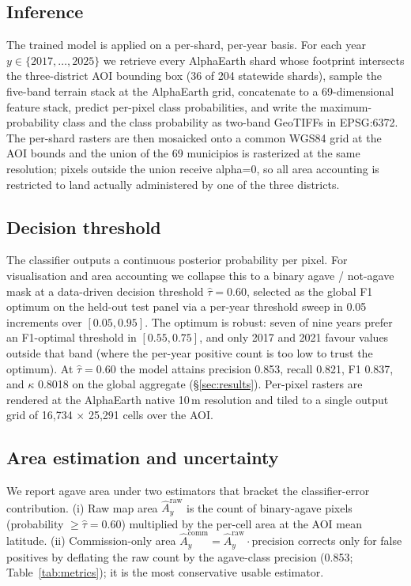 \documentclass[10pt,a4paper]{article}
\begin{document}
\subsection{Inference}

The trained model is applied on a per-shard, per-year basis. For
each year $y \in \{2017,\dots,2025\}$ we retrieve every AlphaEarth
shard whose footprint intersects the three-district AOI bounding
box (36 of 204 statewide shards), sample the five-band terrain
stack at the AlphaEarth grid, concatenate to a 69-dimensional
feature stack, predict per-pixel class probabilities, and write
the maximum-probability class and the class probability as two-band
GeoTIFFs in EPSG:6372. The per-shard rasters are then mosaicked
onto a common WGS84 grid at the AOI bounds and the union of the
69 municipios is rasterized at the same resolution; pixels outside
the union receive alpha=0, so all area accounting is restricted to
land actually administered by one of the three districts.

\subsection{Decision threshold}\label{sec:threshold}

The classifier outputs a continuous posterior probability per
pixel. For visualisation and area accounting we collapse this to a
binary agave / not-agave mask at a data-driven decision threshold
$\hat{\tau} = 0.60$, selected as the global F1 optimum on the
held-out test panel via a per-year threshold sweep in 0.05
increments over $[0.05, 0.95]$. The optimum is robust: seven of
nine years prefer an F1-optimal threshold in $[0.55, 0.75]$, and
only 2017 and 2021 favour values outside that band (where the
per-year positive count is too low to trust the optimum). At
$\hat{\tau} = 0.60$ the model attains precision 0.853, recall
0.821, F1 0.837, and $\kappa$ 0.8018 on the global aggregate
(\S\ref{sec:results}). Per-pixel rasters are rendered at the
AlphaEarth native 10\,m resolution and tiled to a single output
grid of 16{,}734 $\times$ 25{,}291 cells over the AOI.

\subsection{Area estimation and uncertainty}

We report agave area under two estimators that bracket the
classifier-error contribution. (i) Raw map area
$\hat{A}^{\mathrm{raw}}_{y}$ is the count of binary-agave pixels
(probability $\ge \hat{\tau} = 0.60$) multiplied by the per-cell
area at the AOI mean latitude. (ii) Commission-only area
$\hat{A}^{\mathrm{comm}}_{y} = \hat{A}^{\mathrm{raw}}_{y} \cdot
\mathrm{precision}$ corrects only for false positives by deflating
the raw count by the agave-class precision (0.853;
Table~\ref{tab:metrics}); it is the most conservative usable
estimator.
\end{document}
